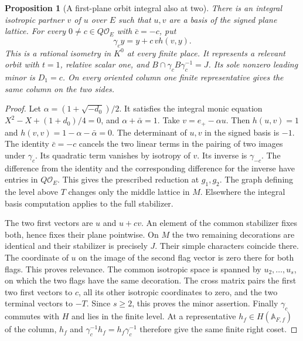 \documentclass[a4paper,11pt]{article}
\newtheorem{proposition}{Proposition}[section]
\theoremstyle{definition}
\theoremstyle{remark}
\numberwithin{equation}{section}
\begin{document}
\begin{proposition}[A first-plane orbit integral also at two]\leavevmode
\label{prop:plane281}
There is an integral isotropic partner \(v\) of \(u\) over \(E\)
such that \(u,v\) are a basis of the signed plane lattice.
For every \(0\ne c\in Q\mathcal O_E\) with \(\bar c=-c\), put
\[
               \gamma_c y=y+c\,v h(v,y).
\]
This is a rational isometry in \(K^0\) at every finite place.
It represents a relevant orbit with \(t=1\), relative scalar
one, and \(B\cap\gamma_c B\gamma_c^{-1}=J\).
Its sole nonzero leading minor is \(D_1=c\). On every oriented
column one finite representative gives the same column on
the two sides.
\end{proposition}
\begin{proof}
Let \(\alpha=(1+\sqrt{-d_0})/2\). It satisfies the integral
monic equation \(X^2-X+(1+d_0)/4=0\), and
\(\alpha+\bar\alpha=1\). Take \(v=e_+-\alpha u\).
Then \(h(u,v)=1\) and \(h(v,v)=1-\alpha-\bar\alpha=0\).
The determinant of \(u,v\) in the signed basis is \(-1\).
The identity \(\bar c=-c\) cancels the two linear terms in
the pairing of two images under \(\gamma_c\). Its quadratic
term vanishes by isotropy of \(v\). Its inverse is
\(\gamma_{-c}\). The difference from the identity and the
corresponding difference for the inverse have entries in
\(Q\mathcal O_E\). This gives the prescribed reduction at
\(g_1,g_2\). The graph defining the level above \(T\) changes
only the middle lattice in \(M\). Elsewhere the integral
basis computation applies to the full stabilizer.

The two first vectors are \(u\) and \(u+cv\).
An element of the common stabilizer fixes both, hence fixes
their plane pointwise. On \(M\) the two remaining decorations
are identical and their stabilizer is precisely \(J\).
Their simple characters coincide there. The coordinate of
\(u\) on the image of the second flag vector is zero there
for both flags. This proves relevance. The common isotropic
space is spanned by \(u_2,\ldots,u_s\), on which the two flags
have the same decoration. The cross matrix pairs the first
two first vectors to \(c\), all its other isotropic
coordinates to zero, and the two terminal vectors to \(-T\).
Since \(s\ge2\), this proves the minor assertion.
Finally \(\gamma_c\) commutes with \(H\) and lies in the finite
level. At a representative \(h_f\in H(\mathbb A_{F,f})\)
of the column, \(h_f\) and \(\gamma_c^{-1}h_f=h_f\gamma_c^{-1}\)
therefore give the same finite right coset.
\end{proof}
\end{document}

